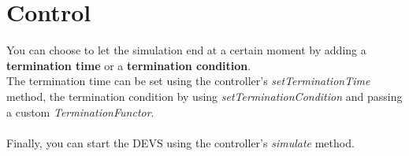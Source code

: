 \section{Control}
You can choose to let the simulation end at a certain moment by adding a \textbf{termination time} or a \textbf{termination condition}.\\
The termination time can be set using the controller's \textsl{setTerminationTime} method, the termination condition by using \textsl{setTerminationCondition} and passing a custom \textsl{TerminationFunctor}.\\ %
\\
Finally, you can start the DEVS using the controller's \textsl{simulate} method.

